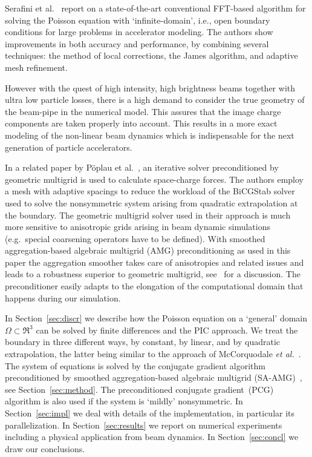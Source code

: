 Serafini et al.~\cite{serafini_2005} report on a state-of-the-art
conventional FFT-based algorithm for solving the Poisson equation with
`infinite-domain', i.e., open boundary conditions for large problems in
accelerator modeling.  The authors show improvements in both accuracy
and performance, by combining several techniques: the method of local
corrections, the James algorithm, and adaptive mesh refinement.

However with the quest of high intensity, high brightness beams together
with ultra low particle losses, there is a high demand to consider the
true geometry of the beam-pipe in the numerical model. This assures that
the image charge components are taken properly into account. This
results in a more exact modeling of the non-linear beam dynamics which
is indispensable for the next generation of particle accelerators.

In a related paper by P{\"o}plau et
al.~\cite{poplau_self-adaptive_2008}, an iterative solver preconditioned
by geometric multigrid is used to calculate space-charge forces.  The
authors employ a mesh with adaptive spacings to reduce the workload of
the BiCGStab solver used to solve the nonsymmetric system arising from
quadratic extrapolation at the boundary.  The geometric multigrid solver
used in their approach is much more sensitive to anisotropic grids
arising in beam dynamic simulations (e.g.\ special coarsening operators
have to be defined).  With smoothed aggregation-based algebraic multigrid
(AMG) preconditioning as used in this paper the aggregation smoother takes
care of anisotropies and related issues and leads to a robustness superior
to geometric multigrid, see~\cite{trcl:09} for a discussion.  The
preconditioner easily adapts to the elongation  of the computational domain
that happens during our simulation.

In Section~\ref{sec:discr} we describe how the Poisson equation on a
`general' domain $\Omega \subset \Re^3$ can be solved by finite
differences and the PIC approach.  We treat the boundary in three
different ways, by constant, by linear, and by quadratic extrapolation,
the latter being similar to the approach of McCorquodale \textit{et
  al.}~\cite{mcgv:04}.  The system of equations is solved by the
conjugate gradient algorithm preconditioned by smoothed
aggregation-based algebraic multigrid (SA-AMG)~\cite{vamb:96a, tuto:00},
see Section~\ref{sec:method}.  The preconditioned conjugate
gradient~(PCG) algorithm is also used if the system is `mildly'
nonsymmetric.  In Section~\ref{sec:impl} we deal with details of the
implementation, in particular its parallelization.  In
Section~\ref{sec:results} we report on numerical experiments including a
physical application from beam dynamics.  In Section~\ref{sec:concl} we
draw our conclusions.

